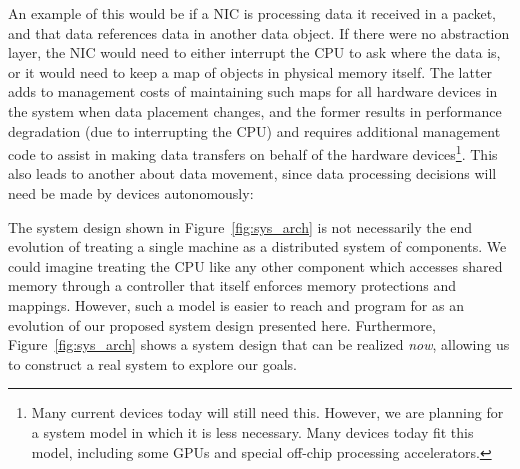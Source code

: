 {        An example of this would be if a NIC is processing data it received in a packet, and that data
        references data in another data object. If there were no abstraction layer, the NIC would need to
        either interrupt the CPU to ask where the data is, or it would need to keep a map of objects in
        physical memory itself. The latter adds to management costs of maintaining such maps for all
        hardware devices in the system when data placement changes, and the former results in performance
        degradation (due to interrupting the CPU) and requires additional management code to assist in
        making data transfers on behalf of the hardware devices\footnote{Many current devices today will
            still need this. However, we are planning for a system model in which it is less necessary. Many
            devices today fit this model, including some GPUs and special off-chip processing
            accelerators.}. This also leads to another \observation about data movement, since data
        processing decisions will need be made by devices autonomously:





        The system design shown in
        Figure~\ref{fig:sys_arch} is not necessarily the end evolution of treating a single machine as a
        distributed system of components. We could imagine treating the CPU like any other component which
        accesses shared memory through a controller that itself enforces memory protections and mappings.
        However, such a model is easier to reach and program for as an evolution of our proposed system
        design presented here. Furthermore, Figure~\ref{fig:sys_arch} shows a system design that can be
        realized \emph{now}, allowing us to construct a real system to explore our goals.


    }


